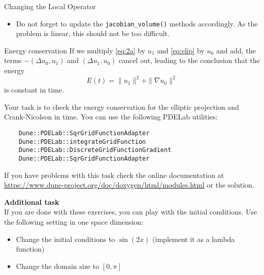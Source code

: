 \documentclass[12pt,a4paper]{article}
\begin{document}
\begin{Exercise}{Changing the Local Operator}
\begin{itemize}
See how it is done for the $\Delta u_0$, we recall the corresponding part of \lstinline{WaveL2::alpha_volume()}:
  \begin{lstlisting}
// integrate u*phi_i
for (size_t i=0; i<lfsu0.size(); i++) {
	r.accumulate(lfsu0,i,u1*phihat[i]*factor);
	r.accumulate(lfsu1,i,u0*phihat[i]*factor);
}
  \end{lstlisting}

\item Do not forget to update the \lstinline{jacobian_volume()} methods accordingly. As the problem is linear, this should not be too difficult.
\end{itemize}
\end{Exercise}
\begin{Exercise}{Energy conservation}
If we multiply \eqref{eq:2a} by $u_1$ and \eqref{eq:elip} by $u_0$ and add, the terms $-(\Delta u_0,u_1 )$ and $(\Delta u_1,u_0 )$ cancel out, leading to the conclusion that the energy $$E(t) = \|u_1\|^2 + \| \nabla u_0\|^2 $$
is constant in time.


Your task is to check the energy conservation for the elliptic projection and Crank-Nicolson in time. You can use the following PDELab utilities:
  \begin{lstlisting}
	Dune::PDELab::SqrGridFunctionAdapter
	Dune::PDELab::integrateGridFunction
	Dune::PDELab::DiscreteGridFunctionGradient
	Dune::PDELab::SqrGridFunctionAdapter
  \end{lstlisting}

If you have problems with this task check the online documentation at
\url{https://www.dune-project.org/doc/doxygen/html/modules.html} or the solution.
\end{Exercise}

\textbf{Additional task}\\
If you are done with these exercises, you can play with the initial conditions. Use the following setting in one space dimension:
\begin{itemize}
\item Change  the initial conditions to $\sin(2x)$ (implement it as a lambda function)
\item Change the domain size to $[0,\pi]$
\end{itemize}




\end{document}
